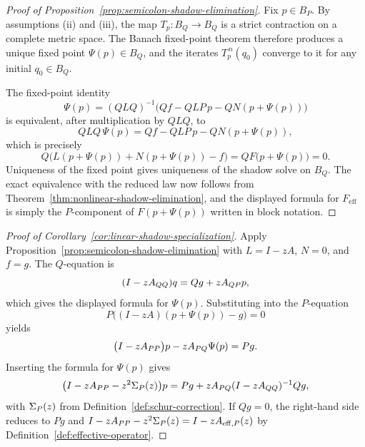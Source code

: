 \begin{proof}[Proof of Proposition~\ref{prop:semicolon-shadow-elimination}]
\label{proof:prop:semicolon-shadow-elimination}
Fix $p\in B_P$. By assumptions (ii) and (iii), the map $T_p:B_Q\to B_Q$ is a
strict contraction on a complete metric space. The Banach fixed-point theorem
therefore produces a unique fixed point $\Psi(p)\in B_Q$, and the iterates
$T_p^{\,n}(q_0)$ converge to it for any initial $q_0\in B_Q$.

The fixed-point identity
\[
\Psi(p)=(QLQ)^{-1}\bigl(Qf-QLP\,p-QN(p+\Psi(p))\bigr)
\]
is equivalent, after multiplication by $QLQ$, to
\[
QLQ\,\Psi(p)=Qf-QLP\,p-QN(p+\Psi(p)),
\]
which is precisely
\[
Q\bigl(L(p+\Psi(p))+N(p+\Psi(p))-f\bigr)=QF\bigl(p+\Psi(p)\bigr)=0.
\]
Uniqueness of the fixed point gives uniqueness of the shadow solve on
$B_Q$. The exact equivalence with the reduced law now follows from
Theorem~\ref{thm:nonlinear-shadow-elimination}, and the displayed formula for
$F_{\mathrm{eff}}$ is simply the $P$-component of $F(p+\Psi(p))$ written in
block notation.
\end{proof}

\begin{proof}[Proof of Corollary~\ref{cor:linear-shadow-specialization}]
\label{proof:cor:linear-shadow-specialization}
Apply Proposition~\ref{prop:semicolon-shadow-elimination} with $L=I-zA$,
$N=0$, and $f=g$. The $Q$-equation is
\[
(I-zA_{QQ})q = Qg + zA_{QP}p,
\]
which gives the displayed formula for $\Psi(p)$. Substituting into the
$P$-equation
\[
P\bigl((I-zA)(p+\Psi(p))-g\bigr)=0
\]
yields
\[
\bigl(I-zA_{PP}\bigr)p - zA_{PQ}\Psi(p)=Pg.
\]
Inserting the formula for $\Psi(p)$ gives
\[
\bigl(I-zA_{PP}-z^2\Sigma_{P}(z)\bigr)p
=
Pg+zA_{PQ}(I-zA_{QQ})^{-1}Qg,
\]
with $\Sigma_{P}(z)$ from Definition~\ref{def:schur-correction}. If
$Qg=0$, the right-hand side reduces to $Pg$ and
$I-zA_{PP}-z^2\Sigma_{P}(z)=I-zA_{\mathrm{eff},P}(z)$ by
Definition~\ref{def:effective-operator}.
\end{proof}

